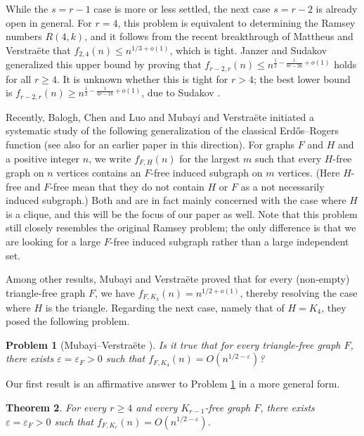 \documentclass[11pt]{article}
\theoremstyle{plain}
\newtheorem{theorem}{Theorem}[section]
\newtheorem{problem}[theorem]{Problem}
\theoremstyle{definition}
\newcommand{\eps}{\varepsilon}
\begin{document}
While the $s=r-1$ case is more or less settled, the next case $s=r-2$ is already open in general. For $r=4$, this problem is equivalent to determining the Ramsey numbers $R(4,k)$, and it follows from the recent breakthrough of Mattheus and Verstra\"ete \cite{Mattheus_Verstraete} that $f_{2,4}(n)\leq n^{1/3+o(1)}$, which is tight. Janzer and Sudakov \cite{Janzer_Sudakov} generalized this upper bound by proving that $f_{r-2,r}(n)\leq n^{\frac{1}{2}-\frac{1}{8r-26}+o(1)}$ holds for all $r\geq 4$. It is unknown whether this is tight for $r>4$; the best lower bound is $f_{r-2,r}(n)\geq n^{\frac{1}{2}-\frac{1}{6r-18}+o(1)}$, due to Sudakov \cite{Sudakov_DRC}.

Recently, Balogh, Chen and Luo \cite{Balogh_Chen_Luo} and Mubayi and Verstra\"ete \cite{MV_general_graphs} initiated a systematic study of the following generalization of the classical Erd\H os--Rogers function (see also \cite{HL24} for an earlier paper in this direction). For graphs $F$ and $H$ and a positive integer $n$, we write $f_{F,H}(n)$ for the largest $m$ such that every $H$-free graph on $n$ vertices contains an $F$-free induced subgraph on $m$ vertices. (Here $H$-free and $F$-free mean that they do not contain $H$ or $F$ as a not necessarily induced subgraph.) Both \cite{Balogh_Chen_Luo} and \cite{MV_general_graphs} are in fact mainly concerned with the case where $H$ is a clique, and this will be the focus of our paper as well. Note that this problem still closely resembles the original Ramsey problem; the only difference is that we are looking for a large $F$-free induced subgraph rather than a large independent set.

Among other results, Mubayi and Verstra\"ete \cite {MV_general_graphs} proved that for every (non-empty) triangle-free graph $F$, we have $f_{F,K_3}(n)=n^{1/2+o(1)}$, thereby resolving the case where $H$ is the triangle. Regarding the next case, namely that of $H=K_4$, they posed the following problem.

\begin{problem}[Mubayi--Verstra\"ete \cite{MV_general_graphs}] \label{problem:trianglefree vs K4}
    Is it true that for every triangle-free graph $F$, there exists $\eps=\eps_F>0$ such that $f_{F,K_4}(n)=O(n^{1/2-\eps})$?
\end{problem}


Our first result is an affirmative answer to Problem \ref{problem:trianglefree vs K4} in a more general form.

\begin{theorem} \label{thm:cliquefree vs clique}
    For every $r\geq 4$ and every $K_{r-1}$-free graph $F$, there exists $\eps=\eps_F>0$ such that $f_{F,K_r}(n)=O(n^{1/2-\eps})$.
\end{theorem}
\end{document}
